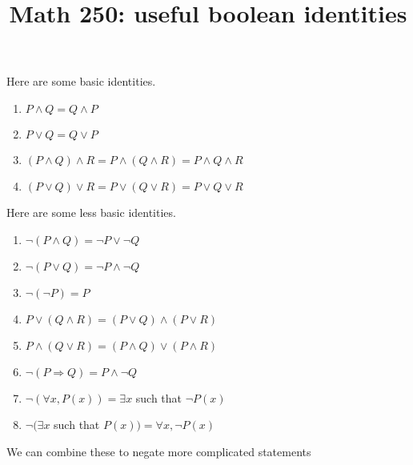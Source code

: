 \documentclass[12pt, reqno]{amsart}
\begin{document}
\title[Math 250: useful boolean  identities]{Math 250: useful boolean identities}\maketitle

Here are some basic identities.
\begin{enumerate}
\item $P \wedge Q = Q \wedge P$
\item $P \vee Q = Q \vee P$
\item $(P \wedge Q) \wedge R = P \wedge (Q \wedge R) = P \wedge Q \wedge R$
\item $(P \vee Q) \vee R = P \vee (Q \vee R) = P \vee Q \vee R$  
\end{enumerate}
\smallskip

Here are some less basic identities.

\begin{enumerate}
\item $\neg(P \wedge Q) = \neg P \vee \neg Q$
\item $\neg(P \vee Q) = \neg P \wedge \neg Q$
\item $\neg(\neg P) = P$
\item $P \vee (Q \wedge R) = (P \vee Q) \wedge (P \vee R)$
\item $P \wedge (Q \vee R) = (P \wedge Q) \vee (P \wedge R)$
\item $\neg (P \Rightarrow Q) = P \wedge \neg Q$
\item $\neg (\forall x, P(x)) = \exists x$  such that $\neg P(x)$
\item $\neg (\exists x$ such that $P(x)) = \forall x, \neg P(x)$

\end{enumerate}
\vspace{10pt}

We can combine these to negate more complicated statements
\end{document}
